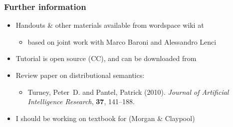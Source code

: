 \begin{frame}
  \frametitle{Further information}

  \begin{itemize}
  \item Handouts \& other materials available from wordspace wiki at
    \begin{center}
    \end{center}
    \begin{itemize}
    \item[\hand] based on joint work with Marco Baroni and Alessandro Lenci
    \end{itemize}
  \item Tutorial is open source (CC), and can be downloaded from
    \begin{center}\small
    \end{center}
    \gap[.5]
  \item Review paper on distributional semantics:
    \begin{itemize}
    \item[] \small\nocite{Turney:Pantel:10}
      Turney, Peter~D. and Pantel, Patrick (2010).
      {\em Journal of Artificial Intelligence Research}, {\bf 37}, 141--188.%
      \nocite{Turney:Pantel:10}
    \end{itemize}
    \gap[.5]
  \item I should be working on textbook  for  (Morgan \& Claypool)
  \end{itemize}

\end{frame}




